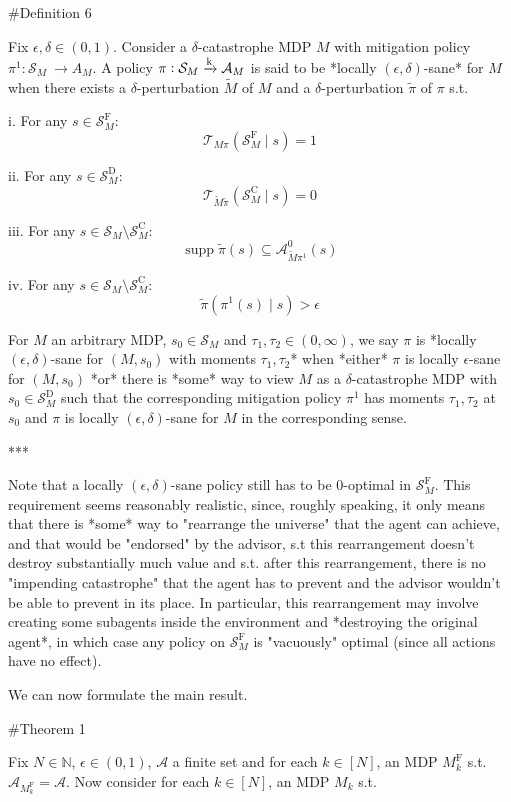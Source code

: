\documentclass[a4paper]{article}
\DeclareMathOperator{\Supp}{supp}
\newcommand{\AP}[1]{\left(#1\right)}
\newcommand{\Nats}{\mathbb{N}}
\newcommand{\M}{\xrightarrow{\textnormal{k}}}
\newcommand{\A}{\mathcal{A}}
\newcommand{\St}{\mathcal{S}}
\newcommand{\T}{\mathcal{T}}
\newcommand{\SF}{\St^{\text{F}}}
\newcommand{\SD}{\St^{\text{D}}}
\newcommand{\SC}{\St^{\text{C}}}
\newcommand{\MF}{M^{\text{F}}}
\begin{document}
\#Definition 6

Fix $\epsilon,\delta \in (0,1)$. Consider a $\delta$-catastrophe MDP $M$ with mitigation policy $\pi^1: \St_M\ \rightarrow A_M$. A policy $\pi: \St_M \M \A_M$ is said to be *locally $(\epsilon,\delta)$-sane* for $M$ when there exists a $\delta$-perturbation $\tilde{M}$ of $M$ and a $\delta$-perturbation $\tilde{\pi}$ of $\pi$ s.t.

i. For any $s \in \SF_M$: $$\T_{M\pi}\AP{\SF_M \mid s} = 1$$

ii. For any $s \in \SD_M$: $$\T_{\tilde{M}\tilde{\pi}}\AP{\SC_M \mid s} = 0$$

iii. For any $s \in \St_M \setminus \SC_M$: $$\Supp{\tilde{\pi}(s)} \subseteq \A_{\tilde{M}\pi^1}^0(s)$$

iv. For any $s \in \St_M \setminus \SC_M$: $$\tilde{\pi}(\pi^1(s) \mid s) > \epsilon$$

For $M$ an arbitrary MDP, $s_0 \in \St_M$ and $\tau_1,\tau_2 \in (0,\infty)$, we say $\pi$ is *locally $(\epsilon,\delta)$-sane for $(M,s_0)$ with moments $\tau_1,\tau_2$* when *either* $\pi$ is locally $\epsilon$-sane for $(M,s_0)$ *or* there is *some* way to view $M$ as a $\delta$-catastrophe MDP with $s_0 \in \SD_M$ such that the corresponding mitigation policy $\pi^1$ has moments $\tau_1,\tau_2$ at $s_0$ and $\pi$ is locally $(\epsilon,\delta)$-sane for $M$ in the corresponding sense.

***

Note that a locally $(\epsilon,\delta)$-sane policy still has to be $0$-optimal in $\SF_M$. This requirement seems reasonably realistic, since, roughly speaking, it only means that there is *some* way to "rearrange the universe" that the agent can achieve, and that would be "endorsed" by the advisor, s.t this rearrangement doesn't destroy substantially much value and s.t. after this rearrangement, there is no "impending catastrophe" that the agent has to prevent and the advisor wouldn't be able to prevent in its place. In particular, this rearrangement may involve creating some subagents inside the environment and *destroying the original agent*, in which case any policy on $\SF_M$ is "vacuously" optimal (since all actions have no effect).

We can now formulate the main result.

\#Theorem 1

Fix $N \in \Nats$, $\epsilon \in (0,1)$, $\A$ a finite set and for each $k \in [N]$, an MDP $\MF_k$ s.t. $\A_{\MF_k} = \A$. Now consider for each $k \in [N]$, an MDP $M_k$ s.t.
\end{document}
